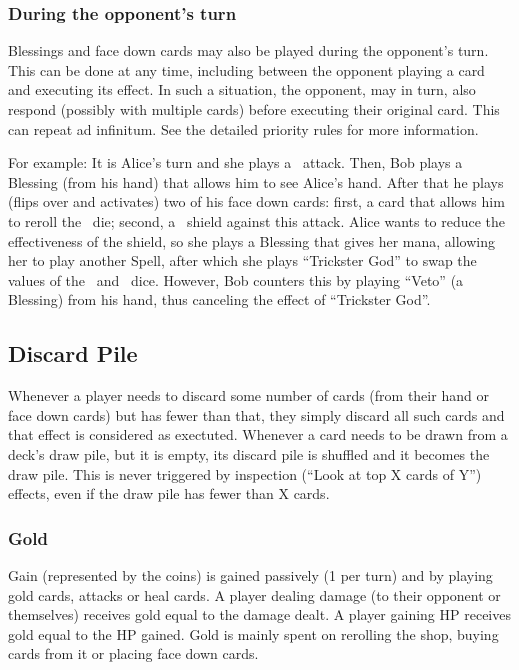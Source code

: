 \documentclass[dvipsnames,parskip,a4paper]{scrartcl}
\newcommand{\iconsize}{3.4mm}
\newcommand{\icondepth}{0.45mm}
\newcommand{\icon}[1]{\raisebox{-\icondepth}{\texttt{[image:  \#1 ]}}}
\newcommand{\fire}{\icon{icons/fire.png}}
\newcommand{\water}{\icon{icons/water.png}}
\begin{document}
\subsubsection*{During the opponent's turn}

Blessings and face down cards may also be played during the opponent's turn. This can be done at any time, including between the opponent playing a card and executing its effect. In such a situation, the opponent, may in turn, also respond (possibly with multiple cards) before executing their original card. This can repeat ad infinitum. See the detailed priority rules for more information.

For example: It is Alice's turn and she plays a \fire \ attack. Then, Bob plays a Blessing (from his hand) that allows him to see Alice's hand. After that he plays (flips over and activates) two of his face down cards: first, a card that allows him to reroll the \fire \ die; second, a \water \ shield against this attack. Alice wants to reduce the effectiveness of the shield, so she plays a Blessing that gives her mana, allowing her to play another Spell, after which she plays ``Trickster God'' to swap the values of the \fire \ and \water \ dice. However, Bob counters this by playing ``Veto'' (a Blessing) from his hand, thus canceling the effect of ``Trickster God''.

\subsection*{Discard Pile}

Whenever a player needs to discard some number of cards (from their hand or face down cards) but has fewer than that, they simply discard all such cards and that effect is considered as exectuted. Whenever a card needs to be drawn from a deck's draw pile, but it is empty, its discard pile is shuffled and it becomes the draw pile. This is never triggered by inspection (``Look at top X cards of Y'') effects, even if the draw pile has fewer than X cards.

\subsubsection*{Gold}

Gain (represented by the coins) is gained passively (1 per turn) and by playing gold cards, attacks or heal cards. A player dealing damage (to their opponent or themselves) receives gold equal to the damage dealt. A player gaining HP receives gold equal to the HP gained. Gold is mainly spent on rerolling the shop, buying cards from it or placing face down cards.
\end{document}
